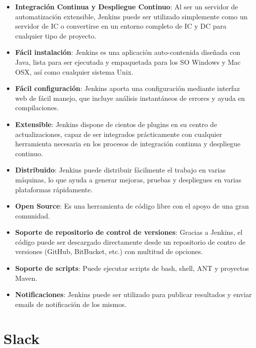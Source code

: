 \begin{itemize}
	\item \textbf{Integración Continua y Despliegue Continuo}: Al ser un servidor de automatización extensible, Jenkins puede ser utilizado simplemente como un servidor de \gls{IC} o convertirse en un entorno completo de \gls{IC} y \gls{DC} para cualquier tipo de proyecto.
	\item \textbf{Fácil instalación}: Jenkins es una aplicación auto-contenida diseñada con Java, lista para ser ejecutada y empaquetada para los \gls{SO} Windows y Mac OSX, así como cualquier sistema Unix.
	\item \textbf{Fácil configuración}: Jenkins aporta una configuración mediante interfaz web de fácil manejo, que incluye análisis instantáneos de errores y ayuda en compilaciones.
	\item \textbf{Extensible}: Jenkins dispone de cientos de plugins en su centro de actualizaciones, capaz de ser integrados prácticamente con cualquier herramienta necesaria en los procesos de integración continua y despliegue continuo.
	\item \textbf{Distribuido}: Jenkins puede distribuir fácilmente el trabajo en varias máquinas, lo que ayuda a generar mejoras, pruebas y despliegues en varias plataformas rápidamente.
	\item \textbf{Open Source}: Es una herramienta de código libre con el apoyo de una gran comunidad.
	\item \textbf{Soporte de repositorio de control de versiones}: Gracias a Jenkins, el código puede ser descargado directamente desde un repositorio de contro de versiones (GitHub, BitBucket, etc.) con multitud de opciones.
	\item \textbf{Soporte de scripts}: Puede ejecutar scripts de bash, shell, ANT y proyectos Maven.
	\item \textbf{Notificaciones}: Jenkins puede ser utilizado para publicar resultados y enviar emails de notificación de los mismos.
\end{itemize}


\section{Slack}

